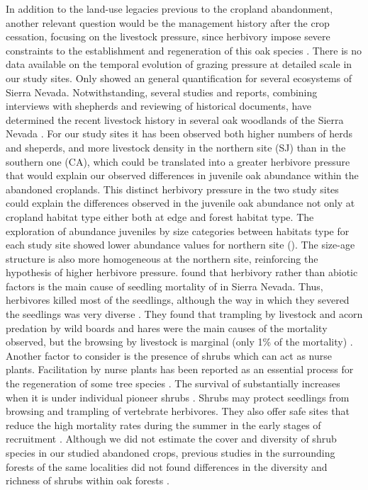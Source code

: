 In addition to the land-use legacies previous to the cropland abandonment, another relevant question would be the management history after the crop cessation, focusing on the livestock pressure, since herbivory impose severe constraints to the establishment and regeneration of this oak species \autocites{Gomez2003ImpactVertebrate, Pereaetal2014InteraccionesPlantaanimal}. There is no data available on the temporal evolution of grazing pressure at detailed scale in our study sites. Only \citet{RoblesCruz2008ConjuntoSierras} showed an general quantification for several ecosystems of Sierra Nevada. Notwithstanding, several studies and reports, combining interviews with shepherds and reviewing of historical documents, have determined the recent livestock history in several oak woodlands of the Sierra Nevada \autocites{MorenoLlorcaetal2016HistoricalAnalysis, MorenoLlorcaetal2014CaracterizacionFuentes,MorenoLlorcaZamora2012CaracterizacionCarga}. For our study sites it has been observed both higher numbers of herds and sheperds, and more livestock density in the northern site (SJ) than in the southern one (CA), which could be translated into a greater herbivore pressure that would explain our observed differences in juvenile oak abundance within the abandoned croplands. This distinct herbivory pressure in the two study sites could explain the differences observed in the juvenile oak abundance not only at cropland habitat type either both at edge and forest habitat type. The exploration of abundance juveniles by size categories between habitats type for each study site showed lower abundance values for northern site (). The size-age structure is also more homogeneous at the northern site, reinforcing the hypothesis of higher herbivore pressure. \citet{Gomez2003ImpactVertebrate} found that herbivory rather than abiotic factors is the main cause of seedling mortality of \Qp in Sierra Nevada. Thus, herbivores killed most of the seedlings, although the way in which they severed the seedlings was very diverse \cite{Gomez2003ImpactVertebrate}. They found that trampling by livestock and acorn predation by wild boards and hares were the main causes of the mortality observed, but the browsing by livestock is marginal (only 1\% of the mortality) \autocite{Gomez2003ImpactVertebrate}. Another factor to consider is the presence of shrubs which can act as nurse plants. Facilitation by nurse plants has been reported as an essential process for the regeneration of some tree species  \autocites{Castroetal2006RestoringQuercus,GomezAparicioetal2004ApplyingPlant}. The survival of \Qp substantially increases when it is under individual pioneer shrubs \autocite{Castroetal2006RestoringQuercus,Costaetal2017CanNative}. Shrubs may protect \Qp seedlings from browsing and trampling of vertebrate herbivores. They also offer safe sites that reduce the high mortality rates during the summer in the early stages of recruitment \autocites{Castroetal2006RestoringQuercus,Barazaetal2004HerbivoryHas}. Although we did not estimate the cover and diversity of shrub species in our studied abandoned crops, previous studies in the surrounding forests of the same localities did not found differences in the diversity and richness of shrubs within oak forests \autocite{Munoz2012BosquesAutoctonos}. 

